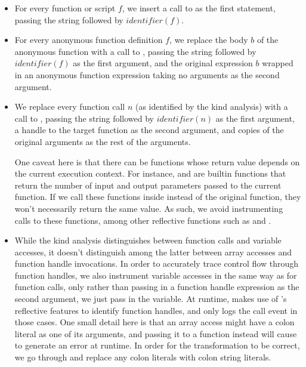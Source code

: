 \begin{itemize}

\item For every function or script $f$, we insert a call to
   as the first statement, passing the string
   followed by $identifier(f)$.

\item For every anonymous function definition $f$, we replace the body $b$ of the
  anonymous function with a call to ,
  passing the string  followed by $identifier(f)$ as the first
  argument, and the original expression $b$ wrapped in an anonymous function
  expression taking no arguments as the second argument.

\item We replace every function call $n$ (as identified by the kind analysis)
  with a call to , passing the string
   followed by $identifier(n)$ as the first argument, a handle to
  the target function as the second argument, and copies of the original
  arguments as the rest of the arguments.

  One caveat here is that there can be functions whose return value
  depends on the current execution context. For instance,  and
   are builtin functions that return the number of input and
  output parameters passed to the current function. If we call these functions
  inside  instead of the original
  function, they won't necessarily return the same value. As such, we avoid
  instrumenting calls to these functions, among other reflective functions such
  as  and .


\item While the kind analysis distinguishes between function calls and variable
  accesses, it doesn't distinguish among the latter between array accesses and
  function handle invocations. In order to accurately trace control flow through
  function handles, we also instrument variable accesses in the same way as for
  function calls, only rather than passing in a function handle expression as
  the second argument, we just pass in the variable. At runtime,
   makes use of \matlab's reflective
  features to identify function handles, and only logs the call event in those
  cases. One small detail here is that an array access might have a colon
  literal as one of its arguments, and passing it to a function instead will
  cause \matlab to generate an error at runtime. In order for the
  transformation to be correct, we go through and replace any colon literals
  with colon string literals.

\end{itemize}

